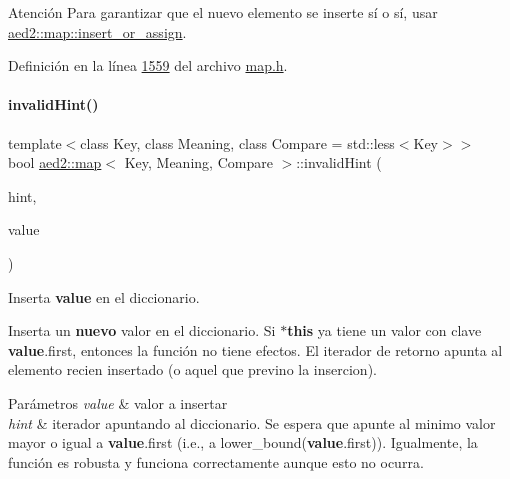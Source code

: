 \begin{DoxyAttention}{Atención}
Para garantizar que el nuevo elemento se inserte sí o sí, usar \hyperlink{classaed2_1_1map_a2ef6723c183916276b0afc4a4c721475_a2ef6723c183916276b0afc4a4c721475}{aed2\+::map\+::insert\+\_\+or\+\_\+assign}. 
\end{DoxyAttention}


Definición en la línea \hyperlink{map_8h_source_l01559}{1559} del archivo \hyperlink{map_8h_source}{map.\+h}.

\mbox{\label{classaed2_1_1map_a7403745a296985d64b8666c18953b2c0_a7403745a296985d64b8666c18953b2c0}} 
\paragraph{\texorpdfstring{invalid\+Hint()}{invalidHint()}}
{\footnotesize\ttfamily template$<$class Key, class Meaning, class Compare = std\+::less$<$\+Key$>$$>$ \\
bool \hyperlink{classaed2_1_1map}{aed2\+::map}$<$ Key, Meaning, Compare $>$\+::invalid\+Hint (\begin{DoxyParamCaption}\item[{\hyperlink{classaed2_1_1map_1_1const__iterator}{const\+\_\+iterator}}]{hint,  }\item[{const \hyperlink{classaed2_1_1map_a719db98e0ff9a837610f76be33264680_a719db98e0ff9a837610f76be33264680}{value\+\_\+type} \&}]{value }\end{DoxyParamCaption})\hspace{0.3cm}{\ttfamily [inline]}}



Inserta {\bfseries value} en el diccionario. 

Inserta un {\bfseries nuevo} valor en el diccionario. Si {\bfseries $\ast$this} ya tiene un valor con clave {\bfseries value}.first, entonces la función no tiene efectos. El iterador de retorno apunta al elemento recien insertado (o aquel que previno la insercion).


\begin{DoxyParams}{Parámetros}
{\em value} & valor a insertar \\
\hline
{\em hint} & iterador apuntando al diccionario. Se espera que apunte al minimo valor mayor o igual a {\bfseries value}.first (i.\+e., a lower\+\_\+bound({\bfseries value}.first)). Igualmente, la función es robusta y funciona correctamente aunque esto no ocurra. \\
\hline
\end{DoxyParams}

